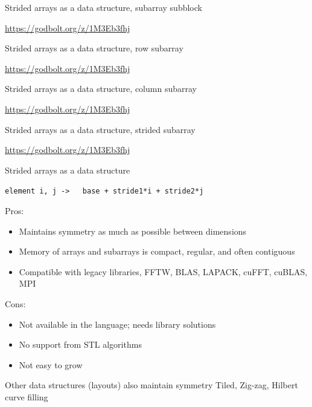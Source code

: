 \documentclass[t,aspectratio=169,handout]{beamer}
\begin{document}
\begin{frame}[label=strided1]{Strided arrays as a data structure, subarray subblock}
\vspace{-1.4cm}


\url{https://godbolt.org/z/1M3Eb3fhj}
\end{frame}

\begin{frame}[label=strided2]{Strided arrays as a data structure, row subarray}
\vspace{-1.4cm}


\url{https://godbolt.org/z/1M3Eb3fhj}
\end{frame}

\begin{frame}[label=strided3]{Strided arrays as a data structure, column subarray}
\vspace{-1.4cm}


\url{https://godbolt.org/z/1M3Eb3fhj}
\end{frame}

\begin{frame}[label=strided4]{Strided arrays as a data structure, strided subarray}
\vspace{-1.4cm}


\url{https://godbolt.org/z/1M3Eb3fhj}
\end{frame}

\begin{frame}[label=strided5]{Strided arrays as a data structure}
\begin{center}
\lstinline|element i, j ->   base + stride1*i + stride2*j|
\end{center}

Pros:
\begin{itemize}
  \item Maintains symmetry as much as possible between dimensions
  \item Memory of arrays and subarrays is compact, regular, and often contiguous
  \item Compatible with legacy libraries, FFTW, BLAS, LAPACK, cuFFT, cuBLAS, MPI
\end{itemize}
Cons:
\begin{itemize}
  \item Not available in the language; needs library solutions
  \item No support from STL algorithms
  \item Not easy to grow
\end{itemize}

\begin{alertblock}{Other data structures (layouts) also maintain symmetry}
  Tiled, Zig-zag, Hilbert curve filling
\end{alertblock}

\end{frame}
\end{document}
